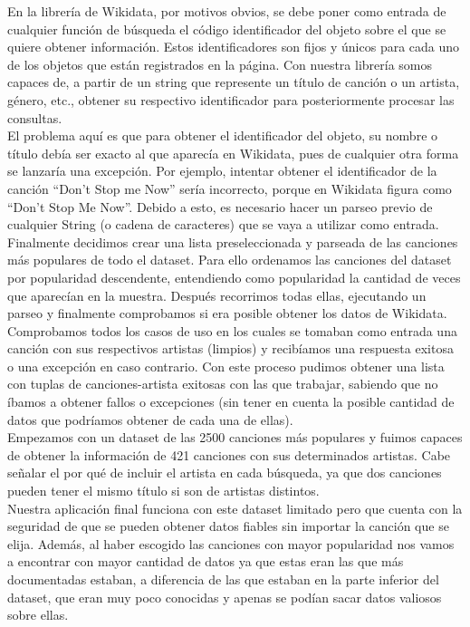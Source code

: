 En la librería de Wikidata, por motivos obvios, se debe poner como entrada de cualquier función de búsqueda el código identificador del objeto sobre el que se quiere obtener información. Estos identificadores son fijos y únicos para cada uno de los objetos que están registrados en la página. Con nuestra librería somos capaces de, a partir de un string que represente un título de canción o un artista, género, etc., obtener su respectivo identificador para posteriormente procesar las consultas.\\

El problema aquí es que para obtener el identificador del objeto, su nombre o título debía ser exacto al que aparecía en Wikidata, pues de cualquier otra forma se lanzaría una excepción. Por ejemplo, intentar obtener el identificador de la canción ``Don’t Stop me Now'' sería incorrecto, porque en Wikidata figura como ``Don’t Stop Me Now''. Debido a esto, es necesario hacer un parseo previo de cualquier String (o cadena de caracteres) que se vaya a utilizar como entrada.\\

Finalmente decidimos crear una lista preseleccionada y parseada de las canciones más populares de todo el dataset. Para ello ordenamos las canciones del dataset por popularidad descendente, entendiendo como popularidad la cantidad de veces que aparecían en la muestra. Después recorrimos todas ellas, ejecutando un parseo y finalmente comprobamos si era posible obtener los datos de Wikidata. Comprobamos todos los casos de uso en los cuales se tomaban como entrada una canción con sus respectivos artistas (limpios) y recibíamos una respuesta exitosa o una excepción en caso contrario. Con este proceso pudimos obtener una lista con tuplas de canciones-artista exitosas con las que trabajar, sabiendo que no íbamos a obtener fallos o excepciones (sin tener en cuenta la posible cantidad de datos que podríamos obtener de cada una de ellas).\\

Empezamos con un dataset de las 2500 canciones más populares y fuimos capaces de obtener la información de 421 canciones con sus determinados artistas. Cabe señalar el por qué de  incluir el artista en cada búsqueda, ya que dos canciones pueden tener el mismo título si son de artistas distintos.\\

Nuestra aplicación final funciona con este dataset limitado pero que cuenta con la seguridad de que se pueden obtener datos fiables sin importar la canción que se elija. Además, al haber escogido las canciones con mayor popularidad nos vamos a encontrar con mayor cantidad de datos ya que estas eran las que más documentadas estaban, a diferencia de las que estaban en la parte inferior del dataset, que eran muy poco conocidas y apenas se podían sacar datos valiosos sobre ellas.


